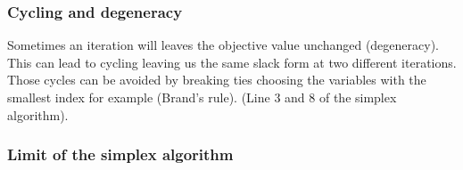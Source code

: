 \begin{scriptsize}
\end{scriptsize}


\subsubsection{Cycling and degeneracy}

Sometimes an iteration will leaves the objective value unchanged
(degeneracy). This can lead to cycling leaving us the same slack form at
two different iterations. Those cycles can be avoided by breaking ties
choosing the variables with the smallest index for example (Brand's
rule). (Line 3 and 8 of the simplex algorithm).

\subsubsection{Limit of the simplex algorithm}

